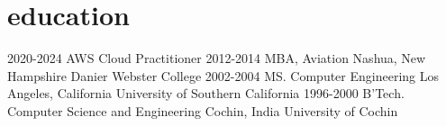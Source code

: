 \section{education}

\begin{entrylist}
  \entry
    {2020-2024}
    {AWS Cloud Practitioner}
  \entry
    {2012-2014}
    {MBA, Aviation}
    {Nashua, New Hampshire}
    {Danier Webster College}
  \entry
    {2002-2004}
    {MS. Computer Engineering}
    {Los Angeles, California}
    {University of Southern California}
  \entry
    {1996-2000}
    {B'Tech. Computer Science and Engineering}
    {Cochin, India}
    {University of Cochin}
\end{entrylist}
